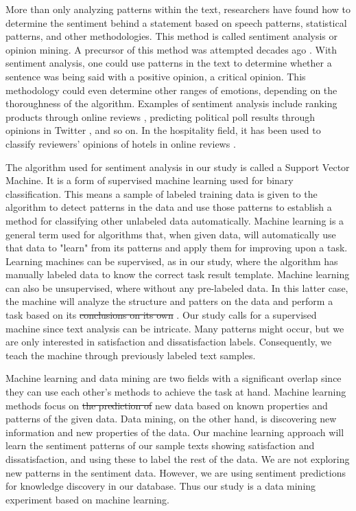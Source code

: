 \documentclass[smallextended,natbib]{svjour3}       %
\providecommand{\DIFadd}[1]{{\protect\color{blue}\uwave{#1}}} %
\providecommand{\DIFdel}[1]{{\protect\color{red}\sout{#1}}}                      %
\providecommand{\DIFaddbegin}{} %
\providecommand{\DIFaddend}{} %
\providecommand{\DIFdelbegin}{} %
\providecommand{\DIFdelend}{} %
\begin{document}
    More than only analyzing patterns within the text, researchers have found how to determine the sentiment behind a statement based on speech patterns, statistical patterns, and other methodologies. This method is called sentiment analysis or opinion mining. A precursor of this method was attempted decades ago \cite[][]{stone1966general}. With sentiment analysis, one could use patterns in the text to determine whether a sentence was being said with a positive opinion, a critical opinion. This methodology could even determine other ranges of emotions, depending on the thoroughness of the algorithm. Examples of sentiment analysis include ranking products through online reviews \cite[e.g][]{liu2017149, zhang2011}, predicting political poll results through opinions in Twitter \cite[][]{oconnor2010}, and so on. In the hospitality field, it has been used to classify reviewers' opinions of hotels in online reviews \DIFdelbegin %
\DIFdelend \DIFaddbegin \cite[e.g.][]{kim2017362, alsmadi2018}\DIFaddend . 

    The algorithm used for sentiment analysis in our study is called a Support Vector Machine. It is a form of supervised machine learning used for binary classification. This means a sample of labeled training data is given to the algorithm to detect patterns in the data and use those patterns to establish a method for classifying other unlabeled data automatically. Machine learning is a general term used for algorithms that, when given data, will automatically use that data to "learn" from its patterns and apply them for improving upon a task. Learning machines can be supervised, as in our study, where the algorithm has manually labeled data to know the correct task result template. Machine learning can also be unsupervised, where without any pre-labeled data. In this latter case, the machine will analyze the structure and patters on the data and perform a task based on its \DIFdelbegin \DIFdel{conclusions on its own }\DIFdelend \DIFaddbegin \DIFadd{own conclusions}\DIFaddend . Our study calls for a supervised machine since text analysis can be intricate. Many patterns might occur, but we are only interested in satisfaction and dissatisfaction labels. Consequently, we teach the machine through previously labeled text samples. 

    Machine learning and data mining are two fields with a significant overlap since they can use each other's methods to achieve the task at hand. Machine learning methods focus on \DIFdelbegin \DIFdel{the prediction of }\DIFdelend \DIFaddbegin \DIFadd{predicting }\DIFaddend new data based on known properties and patterns of the given data. Data mining, on the other hand, is discovering new information and new properties of the data. Our machine learning approach will learn the sentiment patterns of our sample texts showing satisfaction and dissatisfaction, and using these to label the rest of the data. We are not exploring new patterns in the sentiment data. However, we are using sentiment predictions for knowledge discovery in our database. Thus our study is a data mining experiment based on machine learning.
\end{document}
